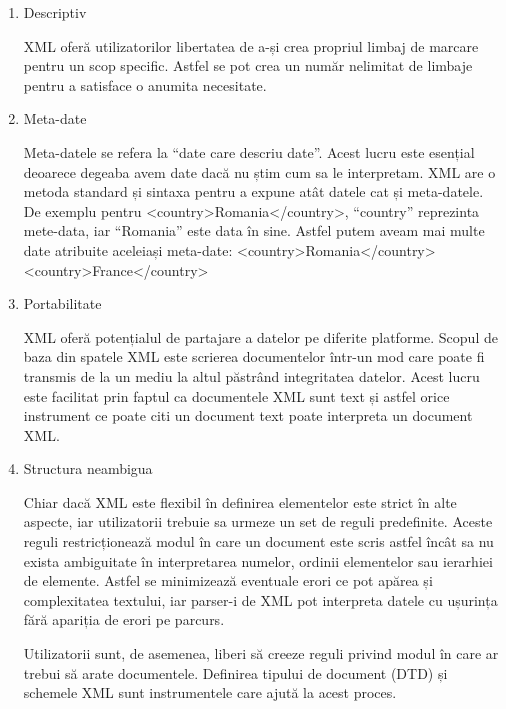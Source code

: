 \begin{enumerate}[wide=0pt, listparindent=1.25em, parsep=0pt]
\item Descriptiv

XML oferă utilizatorilor libertatea de a-și crea propriul limbaj de marcare pentru un scop specific.
Astfel se pot crea un număr nelimitat de limbaje pentru a satisface o anumita necesitate.

\item Meta-date

Meta-datele se refera la “date care descriu date”. 
Acest lucru este esențial deoarece degeaba avem date dacă nu știm cum sa le interpretam. 
XML are o metoda standard și sintaxa pentru a expune atât datele cat și meta-datele. 
De exemplu  pentru <country>Romania</country>, “country” reprezinta mete-data, iar “Romania” este data în sine. 
Astfel putem aveam mai multe date atribuite aceleiași meta-date: 
\newline<country>Romania</country>
\newline<country>France</country>

\item Portabilitate

XML oferă potențialul de partajare a datelor pe diferite platforme. 
Scopul de baza din spatele XML este scrierea documentelor într-un mod care poate fi transmis de la un mediu la altul păstrând 
integritatea datelor. Acest lucru este facilitat prin faptul ca documentele XML sunt text și astfel orice instrument ce poate 
citi un document text poate interpreta un document XML. 

\item Structura neambigua

Chiar dacă XML este flexibil în definirea elementelor este strict în alte aspecte, 
iar utilizatorii trebuie sa urmeze un set de reguli predefinite. 
Aceste reguli restricționează modul în care un document este scris astfel încât sa nu exista ambiguitate în interpretarea numelor, 
ordinii elementelor sau ierarhiei de elemente. Astfel se minimizează eventuale erori ce pot apărea și complexitatea textului, 
iar parser-i de XML pot interpreta datele cu ușurința fără apariția de erori pe parcurs.\newline 

Utilizatorii sunt, de asemenea, liberi să creeze reguli privind modul în care ar trebui să arate documentele.
Definirea tipului de document (DTD) și schemele XML sunt instrumentele care ajută la acest
proces.
\end{enumerate}

